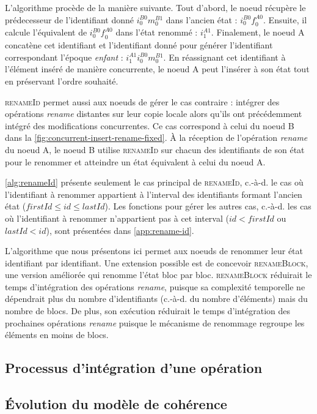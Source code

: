 \documentclass[12pt]{thesul}
\newcommand{\ie}{c.-à-d. }
\newcommand{\trm}[1]{\mathit{#1}}
\newcommand{\id}[3]{$\trm{#1}^{\trm{#2}}_{\trm{#3}}$}
\begin{document}
L'algorithme procède de la manière suivante.
Tout d'abord, le noeud récupère le prédecesseur de l'identifiant donné \id{i}{B0}{0}\id{m}{B1}{0} dans l'ancien état : \id{i}{B0}{0}\id{f}{A0}{0}.
Ensuite, il calcule l'équivalent de \id{i}{B0}{0}\id{f}{A0}{0} dans l'état renommé : \id{i}{A1}{1}.
Finalement, le noeud A concatène cet identifiant et l'identifiant donné pour générer l'identifiant correspondant l'époque \emph{enfant} : \id{i}{A1}{1}\id{i}{B0}{0}\id{m}{B1}{0}.
En réassignant cet identifiant à l'élément inséré de manière concurrente, le noeud A peut l'insérer à son état tout en préservant l'ordre souhaité.

\textsc{renameId} permet aussi aux noeuds de gérer le cas contraire : intégrer des opérations \emph{rename} distantes sur leur copie locale alors qu'ils ont précédemment intégré des modifications concurrentes.
Ce cas correspond à celui du noeud B dans la \autoref{fig:concurrent-insert-rename-fixed}.
À la réception de l'opération \emph{rename} du noeud A, le noeud B utilise \textsc{renameId} sur chacun des identifiants de son état pour le renommer et atteindre un état équivalent à celui du noeud A.

\autoref{alg:renameId} présente seulement le cas principal de \textsc{renameId}, \ie le cas où l'identifiant à renommer appartient à l'interval des identifiants formant l'ancien état ($\trm{firstId} \leq \trm{id} \leq \trm{lastId}$).
Les fonctions pour gérer les autres cas, \ie les cas où l'identifiant à renommer n'appartient pas à cet interval ($\trm{id} < \trm{firstId}$ ou $\trm{lastId} < \trm{id}$), sont présentées dans \autoref{app:rename-id}.

L'algorithme que nous présentons ici permet aux noeuds de renommer leur état identifiant par identifiant.
Une extension possible est de concevoir \textsc{renameBlock}, une version améliorée qui renomme l'état bloc par bloc.
\textsc{renameBlock} réduirait le temps d'intégration des opérations \emph{rename}, puisque sa complexité temporelle ne dépendrait plus du nombre d'identifiants (\ie du nombre d'éléments) mais du nombre de blocs.
De plus, son exécution réduirait le temps d'intégration des prochaines opérations \emph{rename} puisque le mécanisme de renommage regroupe les éléments en moins de blocs.

\subsection{Processus d'intégration d'une opération}
\subsection{Évolution du modèle de cohérence}
\end{document}
